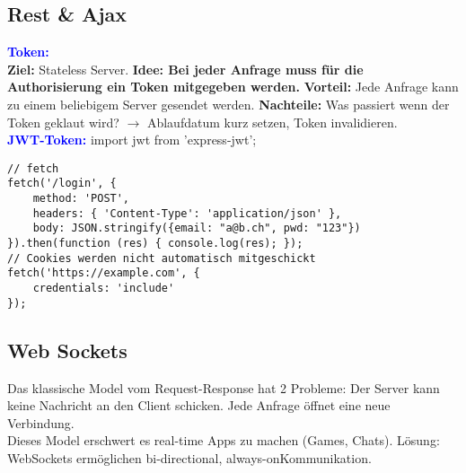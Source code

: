 \subsection{Rest \& Ajax}
\textbf{\textcolor{blue}{Token:}}\\
\textbf{Ziel:} Stateless Server. \textbf{Idee: Bei jeder Anfrage muss für die Authorisierung ein Token mitgegeben werden.} \textbf{Vorteil:} Jede Anfrage kann zu einem beliebigem Server gesendet werden. \textbf{Nachteile:} Was passiert wenn der Token geklaut wird? $\rightarrow$ Ablaufdatum kurz setzen, Token invalidieren.\\
\textbf{\textcolor{blue}{JWT-Token:}} import jwt from 'express-jwt';
\begin{lstlisting}[style=htmlcssjs]
// fetch
fetch('/login', {
    method: 'POST',
    headers: { 'Content-Type': 'application/json' },
    body: JSON.stringify({email: "a@b.ch", pwd: "123"})
}).then(function (res) { console.log(res); });
// Cookies werden nicht automatisch mitgeschickt
fetch('https://example.com', {
    credentials: 'include'
});
\end{lstlisting}
\subsection{Web Sockets}
Das klassische Model vom Request-Response hat 2 Probleme: Der Server kann keine Nachricht an den Client schicken. Jede Anfrage öffnet eine neue Verbindung.\\
Dieses Model erschwert es real-time Apps zu machen (Games, Chats). Lösung: WebSockets ermöglichen \dq bi-directional\dq, \dq always-on\dq Kommunikation.